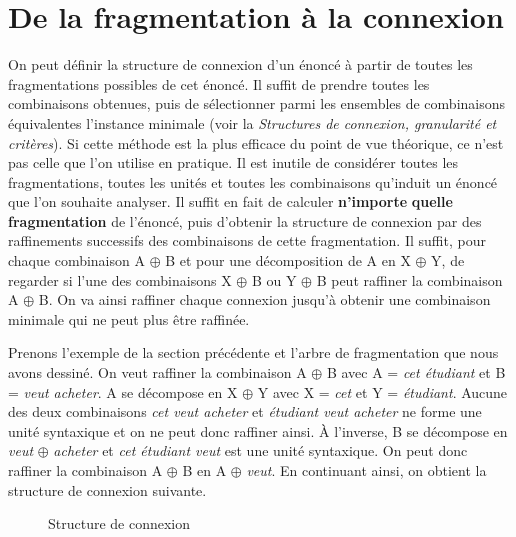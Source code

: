 \section{De la fragmentation à la connexion}\label{sec:3.2.22}

On peut définir la structure de connexion d’un énoncé à partir de toutes les fragmentations possibles de cet énoncé. Il suffit de prendre toutes les combinaisons obtenues, puis de sélectionner parmi les ensembles de combinaisons équivalentes l’instance minimale (voir la  \textit{Structures de connexion, granularité et critères}). Si cette méthode est la plus efficace du point de vue théorique, ce n’est pas celle que l’on utilise en pratique. Il est inutile de considérer toutes les fragmentations, toutes les unités et toutes les combinaisons qu’induit un énoncé que l’on souhaite analyser. Il suffit en fait de calculer \textbf{n’importe} \textbf{quelle fragmentation} de l’énoncé, puis d’obtenir la structure de connexion par des raffinements successifs des combinaisons de cette fragmentation. Il suffit, pour chaque combinaison A ${\oplus}$ B et pour une décomposition de A en X ${\oplus}$ Y, de regarder si l’une des combinaisons X ${\oplus}$ B ou Y ${\oplus}$ B peut raffiner la combinaison A ${\oplus}$ B. On va ainsi raffiner chaque connexion jusqu’à obtenir une combinaison minimale qui ne peut plus être raffinée.

Prenons l’exemple de la section précédente et l’arbre de fragmentation que nous avons dessiné. On veut raffiner la combinaison A ${\oplus}$ B avec A = \textit{cet étudiant} et B = \textit{veut acheter}. A se décompose en X ${\oplus}$ Y avec X = \textit{cet} et Y = \textit{étudiant}. Aucune des deux combinaisons \textit{cet veut acheter} et \textit{étudiant veut acheter} ne forme une unité syntaxique et on ne peut donc raffiner ainsi. À l’inverse, B se décompose en \textit{veut} ${\oplus}$ \textit{acheter} et \textit{cet étudiant veut} est une unité syntaxique. On peut donc raffiner la combinaison A ${\oplus}$ B en A ${\oplus}$ \textit{veut}. En continuant ainsi, on obtient la structure de connexion suivante.

\begin{figure}


\caption{\label{fig:}Structure de connexion}
\end{figure}

